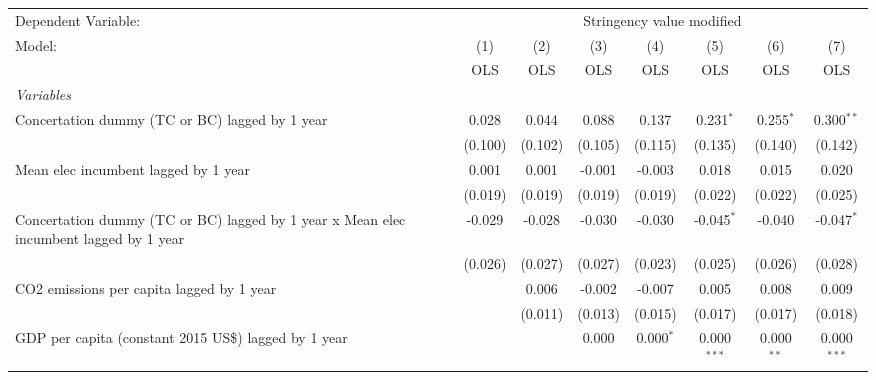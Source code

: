 
\begingroup
\centering
\begin{tabular}{lccccccc}
   \toprule
   Dependent Variable: & \multicolumn{7}{c}{Stringency value modified}\\
   Model:                                                                                & (1)     & (2)     & (3)     & (4)         & (5)           & (6)          & (7)\\  
                                                                                         &  OLS    & OLS     & OLS     & OLS         & OLS           & OLS          & OLS\\  
   \midrule
   \emph{Variables}\\
   Concertation dummy (TC or BC) lagged by 1 year                                        & 0.028   & 0.044   & 0.088   & 0.137       & 0.231$^{*}$   & 0.255$^{*}$  & 0.300$^{**}$\\   
                                                                                         & (0.100) & (0.102) & (0.105) & (0.115)     & (0.135)       & (0.140)      & (0.142)\\   
   Mean elec incumbent lagged by 1 year                                                  & 0.001   & 0.001   & -0.001  & -0.003      & 0.018         & 0.015        & 0.020\\   
                                                                                         & (0.019) & (0.019) & (0.019) & (0.019)     & (0.022)       & (0.022)      & (0.025)\\   
   Concertation dummy (TC or BC) lagged by 1 year x Mean elec incumbent lagged by 1 year & -0.029  & -0.028  & -0.030  & -0.030      & -0.045$^{*}$  & -0.040       & -0.047$^{*}$\\   
                                                                                         & (0.026) & (0.027) & (0.027) & (0.023)     & (0.025)       & (0.026)      & (0.028)\\   
   CO2 emissions per capita lagged by 1 year                                             &         & 0.006   & -0.002  & -0.007      & 0.005         & 0.008        & 0.009\\   
                                                                                         &         & (0.011) & (0.013) & (0.015)     & (0.017)       & (0.017)      & (0.018)\\   
   GDP per capita (constant 2015 US\$) lagged by 1 year                                  &         &         & 0.000   & 0.000$^{*}$ & 0.000$^{***}$ & 0.000$^{**}$ & 0.000$^{***}$\\   

\end{tabular}
